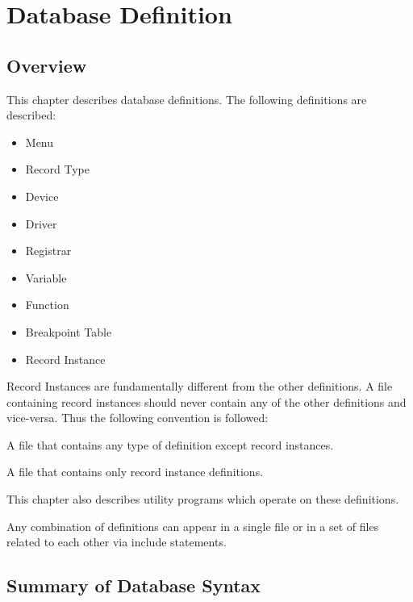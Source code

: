 \chapter{Database Definition}

\section{Overview}

This chapter describes database definitions.
The following definitions are described:

\begin{itemize}
\item Menu
\item Record Type
\item Device
\item Driver
\item Registrar
\item Variable
\item Function
\item Breakpoint Table
\item Record Instance
\end{itemize}

Record Instances are fundamentally different from the other definitions.
A file containing record instances should never contain any of the other definitions and vice-versa.
Thus the following convention is followed:

\begin{description}
\item [Database Definition File] A file that contains any type of definition except record instances.

\item [Record Instance File] A file that contains only record instance definitions.
\end{description}

This chapter also describes utility programs which operate on these definitions.

Any combination of definitions can appear in a single file or in a set of files related to each other via include statements.

\section{Summary of Database Syntax}

